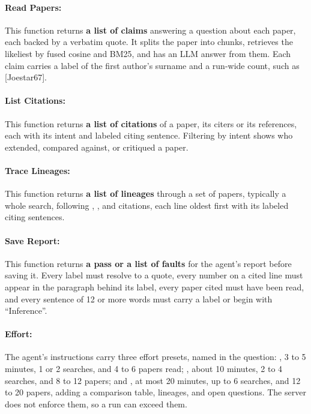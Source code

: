 \paragraph{Read Papers:}
This function returns \textbf{a list of claims} answering a question about each paper, each backed by a verbatim quote. It splits the paper into chunks, retrieves the likeliest by fused cosine and BM25, and has an LLM answer from them. Each claim carries a label of the first author's surname and a run-wide count, such as [Joestar67].

\paragraph{List Citations:}
This function returns \textbf{a list of citations} of a paper, its citers or its references, each with its intent and labeled citing sentence. Filtering by intent shows who extended, compared against, or critiqued a paper.

\paragraph{Trace Lineages:}
This function returns \textbf{a list of lineages} through a set of papers, typically a whole search, following , , and  citations, each line oldest first with its labeled citing sentences.

\paragraph{Save Report:}
This function returns \textbf{a pass or a list of faults} for the agent's report before saving it. Every label must resolve to a quote, every number on a cited line must appear in the paragraph behind its label, every paper cited must have been read, and every sentence of 12 or more words must carry a label or begin with ``Inference''.

\paragraph{Effort:}
The agent's instructions carry three effort presets, named in the question: , 3 to 5 minutes, 1 or 2 searches, and 4 to 6 papers read; , about 10 minutes, 2 to 4 searches, and 8 to 12 papers; and , at most 20 minutes, up to 6 searches, and 12 to 20 papers, adding a comparison table, lineages, and open questions. The server does not enforce them, so a run can exceed them.

